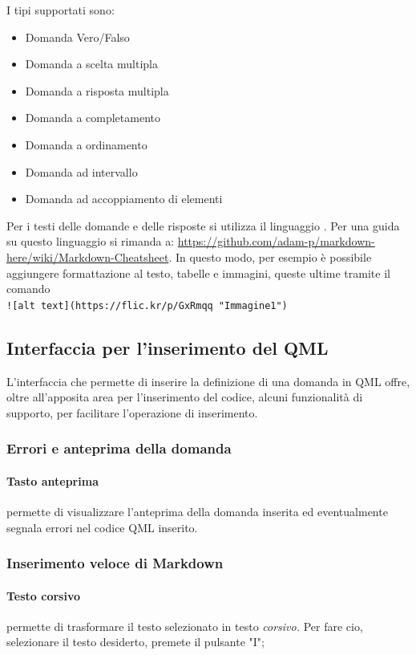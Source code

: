 \documentclass[12pt,a4paper]{article}
\begin{document}
	 I tipi supportati sono:
	\begin{itemize}
		\item Domanda Vero/Falso
		\item Domanda a scelta multipla
		\item Domanda a risposta multipla
		\item Domanda a completamento
		\item Domanda a ordinamento
		\item Domanda ad intervallo
		\item Domanda ad accoppiamento di elementi
	\end{itemize}
	Per i testi delle domande e delle risposte si utilizza il linguaggio . Per una guida su questo linguaggio si rimanda a: \url{https://github.com/adam-p/markdown-here/wiki/Markdown-Cheatsheet}. In questo modo, per esempio è possibile aggiungere formattazione al testo, tabelle e immagini, queste ultime tramite il comando\\
	 \texttt{![alt text](https://flic.kr/p/GxRmqq "Immagine1")}\\
	 
	\subsection{Interfaccia per l'inserimento del QML}
	L'interfaccia che permette di inserire la definizione di una domanda in QML offre, oltre all'apposita area per l'inserimento del codice, alcuni funzionalità di supporto, per facilitare l'operazione di inserimento.
	\subsubsection{Errori e anteprima della domanda}
	\paragraph{Tasto anteprima} permette di visualizzare l'anteprima della domanda inserita ed eventualmente segnala errori nel codice QML inserito.
	\subsubsection{Inserimento veloce di Markdown}
	\paragraph{Testo corsivo} permette di trasformare il testo selezionato in testo\textit{ corsivo.} 
	Per fare cio, selezionare il testo desiderto, premete il pulsante "I";
\end{document}
